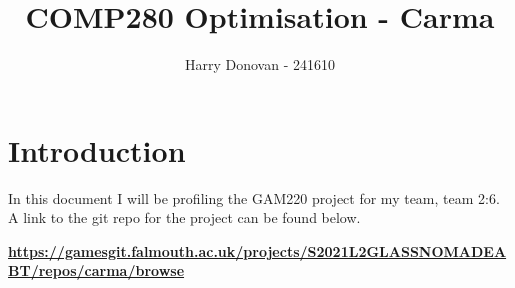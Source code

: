 \documentclass{article}
\title{COMP280 Optimisation - Carma}
\author{Harry Donovan - 241610}
\begin{document}
\maketitle

\tableofcontents

\newpage

\section{Introduction}

In this document I will be profiling the GAM220 project for my team, team 2:6. A link to the git repo for the project can be found below.

\textbf{\url{https://gamesgit.falmouth.ac.uk/projects/S2021L2GLASSNOMADEABT/repos/carma/browse}}



\end{document}

